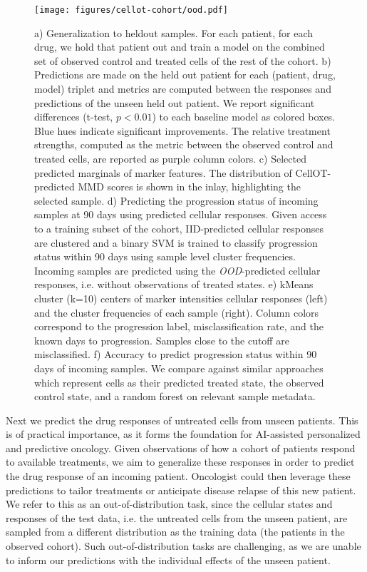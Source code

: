 \begin{figure}[htp!]
  \begin{center}
    \texttt{[image: figures/cellot-cohort/ood.pdf]}
  \end{center}
  \caption{
    a) Generalization to heldout samples. For each patient, for each drug, we hold that patient out and train a model on the combined set of observed control and treated cells of the rest of the cohort.
    b) Predictions are made on the held out patient for each (patient, drug, model) triplet and metrics are computed between the responses and predictions of the unseen held out patient.
    We report significant differences (t-test, $p < 0.01$) to each baseline model as colored boxes. Blue hues indicate significant improvements.
    The relative treatment strengths, computed as the metric between the observed control and treated cells, are reported as purple column colors.
    c) Selected predicted marginals of marker features.
    The distribution of CellOT-predicted MMD scores is shown in the inlay, highlighting the selected sample.
    d) Predicting the progression status of incoming samples at 90 days using predicted cellular responses.
    Given access to a training subset of the cohort, IID-predicted cellular responses are clustered and a binary SVM is trained to classify progression status within 90 days using sample level cluster frequencies.
    Incoming samples are predicted using the \emph{OOD}-predicted cellular responses, i.e. without observations of treated states.
    e) kMeans cluster (k=10) centers of marker intensities cellular responses (left) and the cluster frequencies of each sample (right).
    Column colors correspond to the progression label, misclassification rate, and the known days to progression. Samples close to the cutoff are misclassified.
    f) Accuracy to predict progression status within 90 days of incoming samples.
    We compare against similar approaches which represent cells as their predicted treated state, the observed control state, and a random forest on relevant sample metadata.
  }\label{fig:ood-main}
\end{figure}

Next we predict the drug responses of untreated cells from unseen patients.
This is of practical importance, as it forms the foundation for AI-assisted personalized and predictive oncology.
Given observations of how a cohort of patients respond to available treatments, we aim to generalize these responses in order to predict the drug response of an incoming patient.
Oncologist could then leverage these predictions to tailor treatments or anticipate disease relapse of this new patient.
We refer to this as an out-of-distribution task, since the cellular states and responses of the test data, i.e. the untreated cells from the unseen patient, are sampled from a different distribution as the training data (the patients in the observed cohort).
Such out-of-distribution tasks are challenging, as we are unable to inform our predictions with the individual effects of the unseen patient. 


